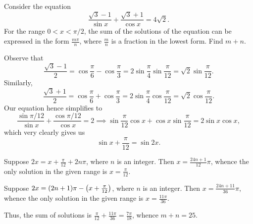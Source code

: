 \begin{question}[25]\label{Q::2024-S-1-15}
    Consider the equation \[\frac{\sqrt3 - 1}{\sin x} + \frac{\sqrt3 + 1}{\cos x} = 4\sqrt2.\] For the range $0 < x < \pi/2$, the sum of the solutions of the equation can be expressed in the form $\frac{m\pi}{n}$, where $\frac{m}{n}$ is a fraction in the lowest form. Find $m + n$.
\end{question}
\begin{solution*}
    Observe that \[\frac{\sqrt3 - 1}{2} = \cos \frac\pi6 - \cos \frac\pi3 = 2\sin \frac\pi4 \sin \frac\pi{12} = \sqrt2 \sin \frac\pi{12}.\] Similarly, \[\frac{\sqrt3 + 1}{2} = \cos \frac\pi6 + \cos \frac\pi3 = 2\sin\frac\pi4 \cos\frac\pi{12} = \sqrt 2 \cos\frac\pi{12}.\] Our equation hence simplifies to \[\frac{\sin{\pi/12}}{\sin x} + \frac{\cos{\pi/12}}{\cos x} = 2 \implies \sin \frac\pi{12} \cos x + \cos x \sin \frac\pi{12} = 2\sin x \cos x,\] which very clearly gives us \[\sin{x + \frac\pi{12}} = \sin{2x}.\]

     Suppose $2x = x + \frac\pi{12} + 2n\pi$, where $n$ is an integer. Then $x = \frac{24n + 1}{12}\pi$, whence the only solution in the given range is $x = \frac{\pi}{12}$.

     Suppose $2x = (2n + 1)\pi - \left( x + \frac\pi{12} \right)$, where $n$ is an integer. Then $x = \frac{24n + 11}{36} \pi$, whence the only solution in the given range is $x = \frac{11\pi}{36}$.

    Thus, the sum of solutions is $\frac{\pi}{12} + \frac{11\pi}{36} = \frac{7\pi}{18}$, whence $m + n = 25$.
\end{solution*}

